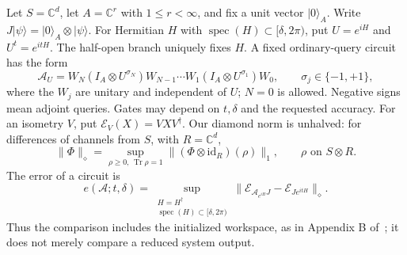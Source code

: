 \documentclass[11pt]{article}
\newcommand{\id}{\mathrm{id}}
\newcommand{\spec}{\operatorname{spec}}
\newcommand{\tr}{\operatorname{Tr}}
\newcommand{\E}{\mathcal E}
\newcommand{\A}{\mathcal A}
\newcommand{\ket}[1]{\lvert #1\rangle}
\begin{document}
Let $S=\mathbb C^d$, let $A=\mathbb C^r$ with $1\leq r<\infty$,
and fix a unit vector $\ket0_A$. Write
$J\ket\psi=\ket0_A\otimes\ket\psi$.
For Hermitian $H$ with $\spec(H)\subset[\delta,2\pi)$, put
$U=e^{iH}$ and $U^t=e^{itH}$. The half-open branch uniquely fixes $H$.
A fixed ordinary-query circuit has the form
\begin{equation}\label{eq:circuit}
 \A_U=W_N(I_A\otimes U^{\sigma_N})W_{N-1}\cdots
 W_1(I_A\otimes U^{\sigma_1})W_0,
 \qquad \sigma_j\in\{-1,+1\},
\end{equation}
where the $W_j$ are unitary and independent of $U$; $N=0$ is allowed.
Negative signs mean adjoint queries. Gates may depend on $t,\delta$ and
the requested accuracy.
For an isometry $V$, put $\E_V(X)=VXV^\dagger$. Our diamond norm is
unhalved: for differences of channels from $S$, with $R=\mathbb C^d$,
\[
 \|\Phi\|_\diamond
 =\sup_{\rho\geq0,\,\tr\rho=1}
   \|(\Phi\otimes\id_R)(\rho)\|_1,
 \qquad \rho\text{ on }S\otimes R.
\]
The error of a circuit is
\begin{equation}\label{eq:error}
 e(\A;t,\delta)=
 \sup_{\substack{H=H^\dagger\\\spec(H)\subset[\delta,2\pi)}}
 \|\E_{\A_{e^{iH}}J}-\E_{Je^{itH}}\|_\diamond.
\end{equation}
Thus the comparison includes the initialized workspace, as in Appendix B
of~\cite{liu}; it does not merely compare a reduced system output.
\end{document}
